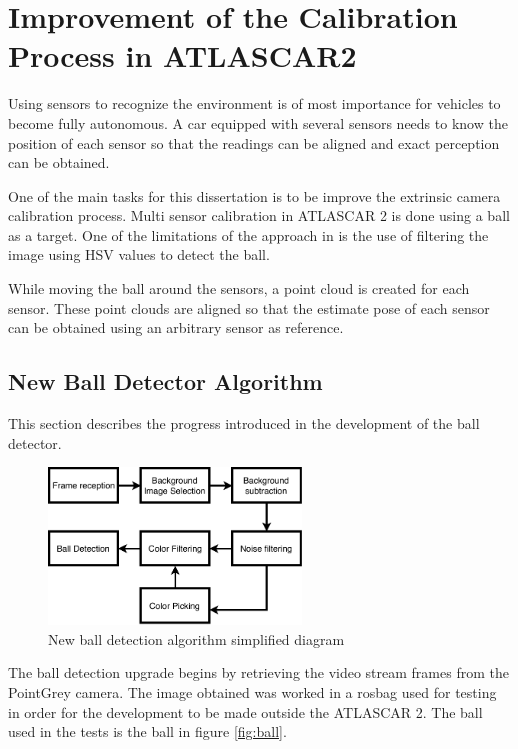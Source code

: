 \chapter{Improvement of the Calibration Process in ATLASCAR2}

Using sensors to recognize the environment is of most importance for vehicles to become fully autonomous. A car equipped with several sensors needs to know the position of each sensor so that the readings can be aligned and exact perception can be obtained. 

One of the main tasks for this dissertation is to be improve the extrinsic camera calibration process. Multi sensor calibration in ATLASCAR 2 is done using a ball as a target. One of the limitations of the approach in \cite{VieiradaSilva2016} is the use of filtering the image using HSV values to detect the ball.

While moving the ball around the sensors, a point cloud is created for each sensor. These point clouds are aligned so that the estimate pose of each sensor can be obtained using an arbitrary sensor as reference.

\section{New Ball Detector Algorithm}

This section describes the progress introduced in the development of the ball detector.

\begin{figure}[htp]
	
	\centering
	\includegraphics[width=0.6\textwidth]{capcalib/imgs/calib_implementation.pdf}
	
	\caption{New ball detection algorithm simplified diagram}
	\label{fig:ball_diagram}
	
\end{figure}

The ball detection upgrade begins by retrieving the video stream frames from the PointGrey camera. The image obtained was worked in a rosbag used for testing in order for the development to be made outside the ATLASCAR 2. The ball used in the tests is the ball in figure \ref{fig:ball}. 

